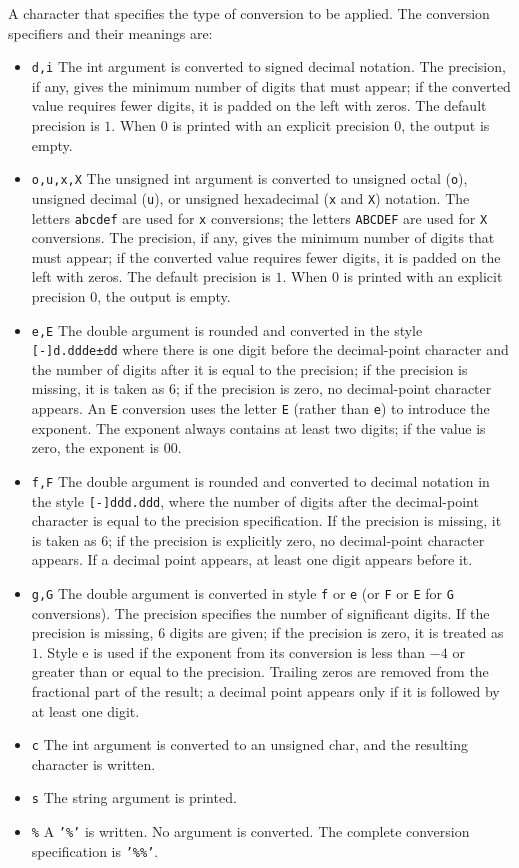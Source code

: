 A character that specifies the type of conversion to be  applied.   The
conversion specifiers and their meanings are:
\begin{itemize}
\item \texttt{d,i}   The  int  argument is converted to signed decimal notation.  The  precision, if any, gives the minimum number of digits that  must   appear;  if  the  converted  value  requires fewer digits, it is    padded on the left with zeros. The default precision is $1$.  When $0$  is printed with an explicit precision $0$, the output is empty.
\item \texttt{o,u,x,X}   The unsigned int argument is converted to  unsigned  octal  (\texttt{o}),  unsigned  decimal  (\texttt{u}),  or unsigned hexadecimal (\texttt{x} and \texttt{X}) notation.  The letters \texttt{abcdef} are used for \texttt{x} conversions;  the  letters \texttt{ABCDEF} are used for \texttt{X} conversions.  The precision, if any,  gives the minimum number of digits that must appear; if the converted  value  requires  fewer  digits, it is padded on the left  with zeros. The default precision is $1$.  When $0$ is printed  with  an explicit precision $0$, the output is empty.
\item \texttt{e,E}    The  double  argument  is  rounded  and  converted  in the style  \texttt{[-]d.ddde±dd} where there is one digit before  the  decimal-point  character and the number of digits after it is equal to the precision; if the precision is missing, it is taken as  $6$;  if  the    precision  is  zero,  no  decimal-point character appears.  An \texttt{E}  conversion uses the letter \texttt{E} (rather than \texttt{e})  to  introduce  the  exponent.   The exponent always contains at least two digits; if  the value is zero, the exponent is $00$.
\item \texttt{f,F}   The double argument is rounded and converted to decimal notation  in  the  style  \texttt{[-]ddd.ddd}, where the number of digits after the decimal-point character is equal to the precision specification.  If  the precision is missing, it is taken as $6$; if the precision  is explicitly zero, no decimal-point character  appears.   If  a   decimal point appears, at least one digit appears before it.
\item \texttt{g,G}   The double argument is converted in style \texttt{f} or \texttt{e} (or \texttt{F} or \texttt{E}  for  \texttt{G}  conversions).  The precision specifies the number of significant digits.  If the precision is missing, $6$ digits  are  given;  if  the  precision is zero, it is treated as $1$.  Style e is used   if the exponent from its conversion is less than $-4$  or  greater than or equal to the precision.  Trailing zeros are removed from  the fractional part of the result; a decimal point appears  only  if it is followed by at least one digit.
\item \texttt{c} The int argument is  converted  to  an  unsigned  char, and  the resulting character is written.
\item \texttt{s} The string argument is printed.
\item \texttt{\%}   A \texttt{'\%'} is written. No argument is converted. The complete conversion specification is \texttt{'\%\%'}.
\end{itemize}
